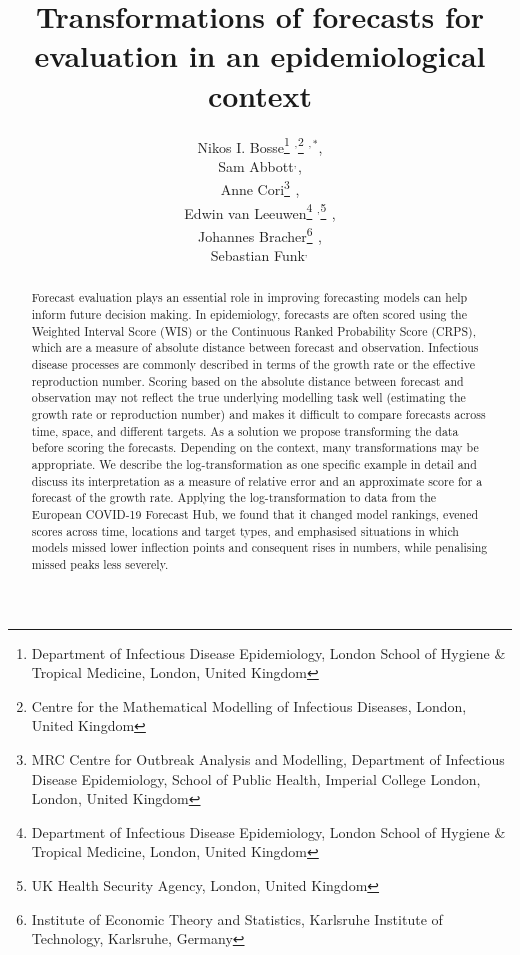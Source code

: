 \documentclass{article}
\begin{document}
\title{Transformations of forecasts for evaluation in an epidemiological context}
  \author{Nikos I. Bosse\thanks{Department of Infectious Disease Epidemiology, London School of Hygiene & Tropical Medicine, London, United Kingdom} $^{,}$\thanks{Centre for the Mathematical Modelling of Infectious Diseases, London, United Kingdom} $^{,*}$, 
  
  Sam Abbott\footnotemark[1] $^{,}$\footnotemark[2]$ ^{}$, 
  
  Anne Cori\thanks{MRC Centre for Outbreak Analysis and Modelling, Department of Infectious Disease Epidemiology, School of Public Health, Imperial College London, London, United Kingdom} $^{}$, \\
  
  Edwin van Leeuwen\thanks{Department of Infectious Disease Epidemiology, London School of Hygiene & Tropical Medicine, London, United Kingdom} $^{,}$\thanks{UK Health Security Agency, London, United Kingdom} $^{}$, 
  
  Johannes Bracher\thanks{Institute of Economic Theory and Statistics, Karlsruhe Institute of Technology, Karlsruhe, Germany} $^{}$, 
  
  Sebastian Funk\footnotemark[1] $^{,}$\footnotemark[2]$ ^{}$
  }



\maketitle
\begin{abstract}
Forecast evaluation plays an essential role in improving forecasting models can help inform future decision making. In epidemiology, forecasts are often scored using the Weighted Interval Score (WIS) or the Continuous Ranked Probability Score (CRPS), which are a measure of absolute distance between forecast and observation. Infectious disease processes are commonly described in terms of the growth rate or the effective reproduction number. Scoring based on the absolute distance between forecast and observation may not reflect the true underlying modelling task well (estimating the growth rate or reproduction number) and makes it difficult to compare forecasts across time, space, and different targets. As a solution we propose transforming the data before scoring the forecasts. Depending on the context, many transformations may be appropriate. We describe the log-transformation as one specific example in detail and discuss its interpretation as a measure of relative error and an approximate score for a forecast of the growth rate. Applying the log-transformation to data from the European COVID-19 Forecast Hub, we found that it changed model rankings, evened scores across time, locations and target types, and emphasised situations in which models missed lower inflection points and consequent rises in numbers, while penalising missed peaks less severely. 
\end{abstract}
\end{document}

